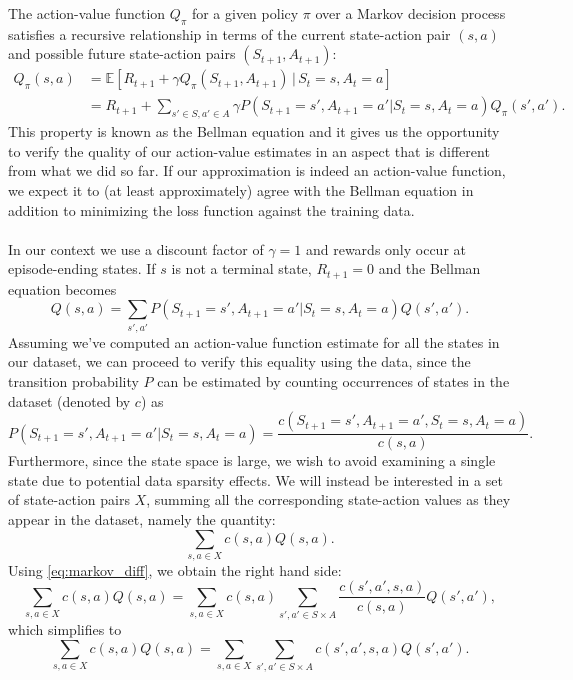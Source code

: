 \documentclass{sfuthesis}
\begin{document}
	The action-value function $Q_\pi$ for a given policy $\pi$ over a Markov decision process satisfies a recursive relationship in terms of the current state-action pair $(s,a)$ and possible future state-action pairs $(S_{t+1},A_{t+1})$: 
	\begin{align}
		Q_\pi(s,a) &= \mathbb{E} \left[  R_{t+1} + \gamma Q_{\pi}(S_{t+1}, A_{t+1}) \, | \, S_t = s, A_t = a \right]\\
		&=  R_{t+1} + \sum_{s' \in S, a' \in A} \gamma P(S_{t+1} = s', A_{t+1} = a' | S_t = s, A_t = a) Q_\pi(s',a').
	\end{align}
	This property is known as the Bellman equation \cite{sutton2018reinforcement} and it gives us the opportunity to verify the quality of our action-value estimates in an aspect that is different from what we did so far. If our approximation is indeed an action-value function, we expect it to (at least approximately) agree with the Bellman equation in addition to minimizing the loss function against the training data.\\\\
	In our context we use a discount factor of $\gamma = 1$ and rewards only occur at episode-ending states. If $s$ is not a terminal state, $R_{t+1} = 0$ and the Bellman equation becomes
	\begin{equation}
		Q(s,a) = \sum_{s',a'} P(S_{t+1} = s', A_{t+1} = a' | S_t = s, A_t = a) Q(s',a').
		\label{eq:markov_diff}
	\end{equation}
	Assuming we've computed an action-value function estimate for all the states in our dataset, we can proceed to verify this equality using the data, since the transition probability $P$ can be estimated by counting occurrences of states in the dataset (denoted by $c$) as
	$$P(S_{t+1} = s', A_{t+1} = a' | S_t = s, A_t = a) = \frac{c(S_{t+1} = s', A_{t+1} = a', S_t = s, A_t = a)}{c(s,a)}.$$
	Furthermore, since the state space is large, we wish to avoid examining a single state due to potential data sparsity effects. We will instead be interested in a set of state-action pairs $X$, summing all the corresponding state-action values as they appear in the dataset, namely the quantity:
	$$\sum_{s,a\in X} c(s,a)Q(s,a).$$
	Using \eqref{eq:markov_diff}, we obtain the right hand side:
	\begin{equation}
		\sum_{s,a\in X} c(s,a)Q(s,a) = \sum_{s,a\in X} c(s,a)\sum_{s',a'\in S\times A} \frac{c(s',a',s,a)}{c(s,a)} Q(s',a'),
	\end{equation}
	which simplifies to
	\begin{equation}
		\sum_{s,a\in X} c(s,a)Q(s,a) = \sum_{s,a\in X} \sum_{s',a'\in S\times A} c(s',a',s,a) Q(s',a').
		\label{eq:markov_num}
	\end{equation}
\end{document}
